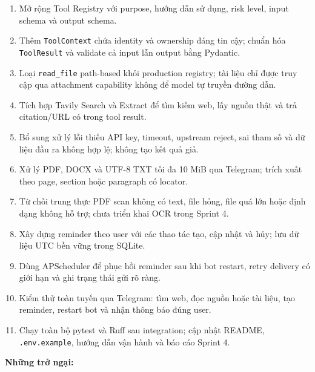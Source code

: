 \documentclass[12pt,a4paper]{article}
\begin{document}
\begin{enumerate}
    \item Mở rộng Tool Registry với purpose, hướng dẫn sử dụng, risk level, input schema và output schema.

    \item Thêm \texttt{ToolContext} chứa identity và ownership đáng tin cậy; chuẩn hóa \texttt{ToolResult} và validate cả input lẫn output bằng Pydantic.

    \item Loại \texttt{read\_file} path-based khỏi production registry; tài liệu chỉ được truy cập qua attachment capability không để model tự truyền đường dẫn.

    \item Tích hợp Tavily Search và Extract để tìm kiếm web, lấy nguồn thật và trả citation/URL có trong tool result.

    \item Bổ sung xử lý lỗi thiếu API key, timeout, upstream reject, sai tham số và dữ liệu đầu ra không hợp lệ; không tạo kết quả giả.

    \item Xử lý PDF, DOCX và UTF-8 TXT tối đa 10 MiB qua Telegram; trích xuất theo page, section hoặc paragraph có locator.

    \item Từ chối trung thực PDF scan không có text, file hỏng, file quá lớn hoặc định dạng không hỗ trợ; chưa triển khai OCR trong Sprint 4.

    \item Xây dựng reminder theo user với các thao tác tạo, cập nhật và hủy; lưu dữ liệu UTC bền vững trong SQLite.

    \item Dùng APScheduler để phục hồi reminder sau khi bot restart, retry delivery có giới hạn và ghi trạng thái gửi rõ ràng.

    \item Kiểm thử toàn tuyến qua Telegram: tìm web, đọc nguồn hoặc tài liệu, tạo reminder, restart bot và nhận thông báo đúng user.

    \item Chạy toàn bộ pytest và Ruff sau integration; cập nhật README, \texttt{.env.example}, hướng dẫn vận hành và báo cáo Sprint 4.
\end{enumerate}

\textbf{Những trở ngại:}
\end{document}
